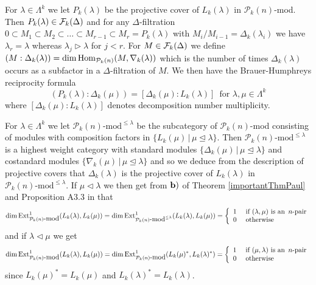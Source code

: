 \documentclass[10pt,hidelinks]{article}
\newcommand{\ParAlg}{{\mathcal P }_{k}}
\newcommand{\Hom}{{\rm Hom}}
\newcommand{\Ext}{{\rm Ext}}
\numberwithin{equation}{section}
\begin{document}
\medskip
For $ \lambda \in \Lambda^k $ we let $P_k(\lambda) $ be the projective cover of $ L_k(\lambda) $
in $ \ParAlg(n) $-mod. 
Then $ P_k(\lambda ) \in  {\cal F}_k(\Delta) $ and for any $ \Delta $-filtration
$ 0 \subset M_1 \subset M_2 \subset \ldots \subset M_{r-1} \subset  M_r = P_k(\lambda ) $
with $ M_i/ M_{i-1} = \Delta_k(\lambda_i) $ 
we have $ \lambda_r  =\lambda  $ whereas $ \lambda_j  \rhd \lambda $ for $ j <r$. 
For $ M \in {\cal F}_k(\Delta) $ we define $ (M: \Delta_k(\lambda)) = \dim \Hom_{\ParAlg(n)}(M, \nabla_k(\lambda))$
which is the number of times $ \Delta_k(\lambda) $ occurs as a subfactor in
a $ \Delta$-filtration of $ M$. We then have the Brauer-Humphreys reciprocity formula 
\begin{equation}\label{reciprocity}
(P_k(\lambda): \Delta_k(\mu))  = [ \Delta_k(\mu): L_k(\lambda) ] \, \, \, \mbox{for } \lambda, \mu \in \Lambda^k
\end{equation}  
where $ [ \Delta_k(\mu): L_k(\lambda) ] $ denotes decomposition number multiplicity. 

\medskip
For $ \lambda \in \Lambda^k$ we let $ \ParAlg(n) \mbox{-mod}^{\le \lambda}$ be the subcategory 
of $ \ParAlg(n) $-mod consisting of modules 
with composition factors in $ \{ L_k(\mu) \,|  \, \mu \unlhd \lambda\}$. Then $ \ParAlg(n) \mbox{-mod}^{\le \lambda}$ is a highest weight category with standard modules
$ \{ \Delta_k(\mu) \, | \, \mu \unlhd \lambda \} $ and costandard modules
$ \{ \nabla_k(\mu) \, | \, \mu \unlhd \lambda \} $ and so we deduce from the description
of projective covers 
that $ \Delta_k(\lambda) $ is the projective cover of $ L_k(\lambda) $ in
$\ParAlg(n) \mbox{-mod}^{\le \lambda} $. If $ \mu \lhd \lambda  $ we then get
from $ { \bf b)} $ of Theorem \ref{importantThmPaul} and Proposition A3.3 in \cite{Donkin} that
\begin{equation}\label{84}
\dim   \Ext^1_{\ParAlg(n) \mbox{-mod}}(L_k(\lambda), L_k(\mu) )  =
 \dim \Ext^1_{\ParAlg(n) \mbox{-mod}^{\le \lambda}}(L_k(\lambda), L_k(\mu) )  =
 \left\{ \begin{array}{ll} 1 & \mbox{ if }  (\lambda, \mu ) \mbox{ is an } \,n\mbox{-pair} \\
0 & \mbox{ otherwise } \end{array} \right.
\end{equation}  
and if $ \lambda \lhd \mu  $ we get 
\begin{equation}\label{85}
\dim   \Ext^1_{\ParAlg(n) \mbox{-mod}}(L_k(\lambda), L_k(\mu) )  =
 \dim \Ext^1_{\ParAlg(n) \mbox{-mod}}(L_k(\mu)^{\ast}, L_k(\lambda)^{\ast} )  =
 \left\{ \begin{array}{ll} 1 & \mbox{ if }  (\mu, \lambda ) \mbox{ is an } \,n\mbox{-pair} \\
0 & \mbox{ otherwise } \end{array} \right.
\end{equation}  
since $ L_k(\mu)^{\ast} = L_k(\mu) $ and $ L_k(\lambda)^{\ast} = L_k(\lambda) $. 
\end{document}
